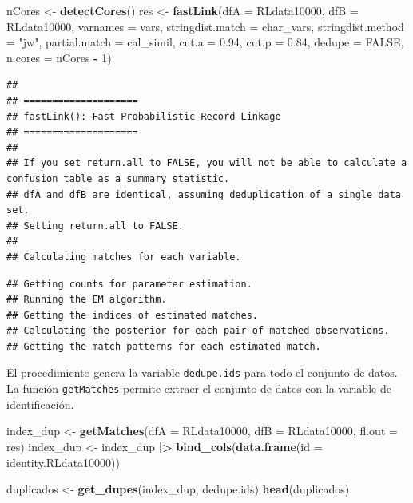 \documentclass[
  12pt,
]{book}
\newenvironment{Shaded}{\begin{snugshade}}{\end{snugshade}}
\newcommand{\AttributeTok}[1]{\textcolor[rgb]{0.13,0.29,0.53}{#1}}
\newcommand{\ConstantTok}[1]{\textcolor[rgb]{0.56,0.35,0.01}{#1}}
\newcommand{\DecValTok}[1]{\textcolor[rgb]{0.00,0.00,0.81}{#1}}
\newcommand{\FloatTok}[1]{\textcolor[rgb]{0.00,0.00,0.81}{#1}}
\newcommand{\FunctionTok}[1]{\textcolor[rgb]{0.13,0.29,0.53}{\textbf{#1}}}
\newcommand{\NormalTok}[1]{#1}
\newcommand{\OtherTok}[1]{\textcolor[rgb]{0.56,0.35,0.01}{#1}}
\newcommand{\SpecialCharTok}[1]{\textcolor[rgb]{0.81,0.36,0.00}{\textbf{#1}}}
\newcommand{\StringTok}[1]{\textcolor[rgb]{0.31,0.60,0.02}{#1}}
\begin{document}
\begin{Shaded}
\begin{Highlighting}[]
\NormalTok{nCores }\OtherTok{\textless{}{-}} \FunctionTok{detectCores}\NormalTok{()}
\NormalTok{res }\OtherTok{\textless{}{-}} \FunctionTok{fastLink}\NormalTok{(}\AttributeTok{dfA =}\NormalTok{ RLdata10000, }\AttributeTok{dfB =}\NormalTok{ RLdata10000,}
                \AttributeTok{varnames =}\NormalTok{ vars,}
                \AttributeTok{stringdist.match =}\NormalTok{ char\_vars,}
                \AttributeTok{stringdist.method =} \StringTok{"jw"}\NormalTok{,}
                \AttributeTok{partial.match =}\NormalTok{ cal\_simil,}
                \AttributeTok{cut.a =} \FloatTok{0.94}\NormalTok{,}
                \AttributeTok{cut.p =} \FloatTok{0.84}\NormalTok{,}
                \AttributeTok{dedupe =} \ConstantTok{FALSE}\NormalTok{,}
                \AttributeTok{n.cores =}\NormalTok{ nCores }\SpecialCharTok{{-}} \DecValTok{1}\NormalTok{)}
\end{Highlighting}
\end{Shaded}

\begin{verbatim}
## 
## ==================== 
## fastLink(): Fast Probabilistic Record Linkage
## ==================== 
## 
## If you set return.all to FALSE, you will not be able to calculate a confusion table as a summary statistic.
## dfA and dfB are identical, assuming deduplication of a single data set.
## Setting return.all to FALSE.
## 
## Calculating matches for each variable.
\end{verbatim}

\begin{verbatim}
## Getting counts for parameter estimation.
## Running the EM algorithm.
## Getting the indices of estimated matches.
## Calculating the posterior for each pair of matched observations.
## Getting the match patterns for each estimated match.
\end{verbatim}

El procedimiento genera la variable \texttt{dedupe.ids} para todo el conjunto de datos. La función \texttt{getMatches} permite extraer el conjunto de datos con la variable de identificación.

\begin{Shaded}
\begin{Highlighting}[]
\NormalTok{index\_dup }\OtherTok{\textless{}{-}} \FunctionTok{getMatches}\NormalTok{(}\AttributeTok{dfA =}\NormalTok{ RLdata10000, }\AttributeTok{dfB =}\NormalTok{ RLdata10000, }\AttributeTok{fl.out =}\NormalTok{ res) }
\NormalTok{index\_dup }\OtherTok{\textless{}{-}}\NormalTok{ index\_dup }\SpecialCharTok{|\textgreater{}} \FunctionTok{bind\_cols}\NormalTok{(}\FunctionTok{data.frame}\NormalTok{(}\AttributeTok{id =}\NormalTok{ identity.RLdata10000))}

\NormalTok{duplicados }\OtherTok{\textless{}{-}} \FunctionTok{get\_dupes}\NormalTok{(index\_dup, dedupe.ids)}
\FunctionTok{head}\NormalTok{(duplicados)}
\end{Highlighting}
\end{Shaded}
\end{document}
